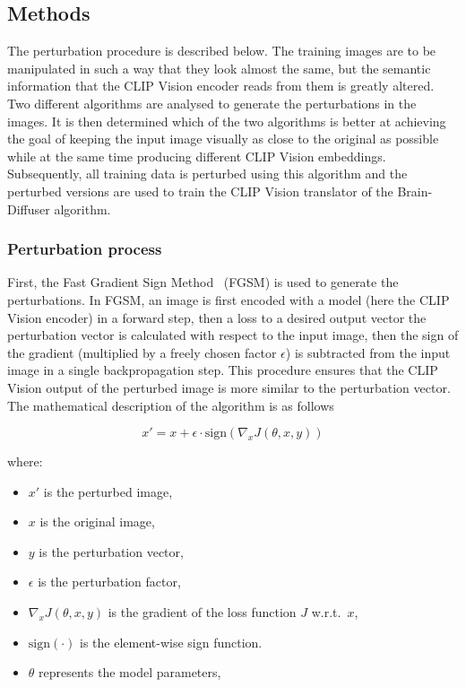 \subsection{Methods}

The perturbation procedure is described below. The training images are to be manipulated in such a way that they look almost the same, but the semantic information that the CLIP Vision encoder reads from them is greatly altered. Two different algorithms are analysed to generate the perturbations in the images. It is then determined which of the two algorithms is better at achieving the goal of keeping the input image visually as close to the original as possible while at the same time producing different CLIP Vision embeddings. Subsequently, all training data is perturbed using this algorithm and the perturbed versions are used to train the CLIP Vision translator of the Brain-Diffuser algorithm.

\subsubsection{Perturbation process}

First, the Fast Gradient Sign Method~\cite{goodfellowExplainingHarnessingAdversarial2014} (FGSM) is used to generate the perturbations. In FGSM, an image is first encoded with a model (here the CLIP Vision encoder) in a forward step, then a loss to a desired output vector the perturbation vector is calculated with respect to the input image, then the sign of the gradient (multiplied by a freely chosen factor $\epsilon$) is subtracted from the input image in a single backpropagation step. This procedure ensures that the CLIP Vision output of the perturbed image is more similar to the perturbation vector. The mathematical description of the algorithm is as follows

\[
x' = x + \epsilon \cdot \text{sign}(\nabla_x J(\theta, x, y))
\]

where:
\begin{itemize}
    \item \( x' \) is the perturbed image,
    \item \( x \) is the original image,
    \item \( y \) is the perturbation vector,
    \item \( \epsilon \) is the perturbation factor,
    \item \( \nabla_x J(\theta, x, y) \) is the gradient of the loss function \( J \) w.r.t.\ \( x \),
    \item \( \text{sign}(\cdot) \) is the element-wise sign function.
    \item \( \theta \) represents the model parameters,
\end{itemize}

